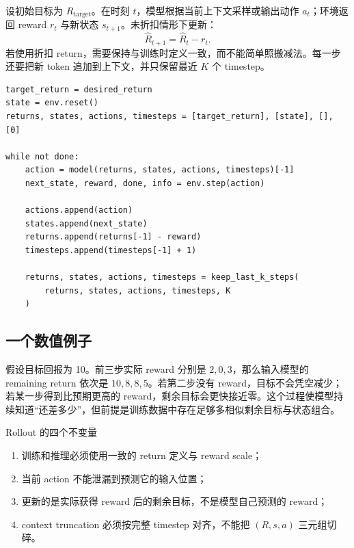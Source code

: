 设初始目标为 $R_{\mathrm{target}}$。在时刻 $t$，模型根据当前上下文采样或输出动作 $a_t$；环境返回 reward $r_t$ 与新状态 $s_{t+1}$。未折扣情形下更新：
\[
\widehat{R}_{t+1}=\widehat{R}_t-r_t.
\]
若使用折扣 return，需要保持与训练时定义一致，而不能简单照搬减法。每一步还要把新 token 追加到上下文，并只保留最近 $K$ 个 timestep。


\begin{lstlisting}[caption={未折扣 return-to-go 下的 autoregressive rollout},label={lst:dt-rollout}]
target_return = desired_return
state = env.reset()
returns, states, actions, timesteps = [target_return], [state], [], [0]

while not done:
    action = model(returns, states, actions, timesteps)[-1]
    next_state, reward, done, info = env.step(action)

    actions.append(action)
    states.append(next_state)
    returns.append(returns[-1] - reward)
    timesteps.append(timesteps[-1] + 1)

    returns, states, actions, timesteps = keep_last_k_steps(
        returns, states, actions, timesteps, K
    )
\end{lstlisting}

\subsection{一个数值例子}

假设目标回报为 10。前三步实际 reward 分别是 $2,0,3$，那么输入模型的 remaining return 依次是 $10,8,8,5$。若第二步没有 reward，目标不会凭空减少；若某一步得到比预期更高的 reward，剩余目标会更快接近零。这个过程使模型持续知道“还差多少”，但前提是训练数据中存在足够多相似剩余目标与状态组合。

\begin{importantbox}{Rollout 的四个不变量}
\begin{enumerate}
  \item 训练和推理必须使用一致的 return 定义与 reward scale；
  \item 当前 action 不能泄漏到预测它的输入位置；
  \item 更新的是实际获得 reward 后的剩余目标，不是模型自己预测的 reward；
  \item context truncation 必须按完整 timestep 对齐，不能把 $(R,s,a)$ 三元组切碎。
\end{enumerate}
\end{importantbox}

